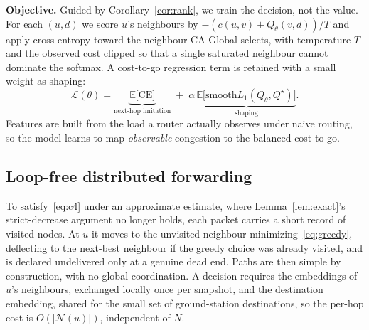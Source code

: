 \documentclass[conference]{IEEEtran}
\begin{document}
\textbf{Objective.} Guided by Corollary~\ref{cor:rank}, we train the decision, not the value. For each $(u,d)$ we score $u$'s neighbours by $-(c(u,v)+Q_\theta(v,d))/T$ and apply cross-entropy toward the neighbour CA-Global selects, with temperature $T$ and the observed cost clipped so that a single saturated neighbour cannot dominate the softmax. A cost-to-go regression term is retained with a small weight as shaping:
\begin{equation}
\mathcal{L}(\theta)=\underbrace{\mathbb{E}\big[\mathrm{CE}\big]}_{\text{next-hop imitation}}\;+\;\alpha\,\underbrace{\mathbb{E}\big[\mathrm{smooth}L_1(Q_\theta,Q^\star)\big]}_{\text{shaping}} .
\end{equation}
Features are built from the load a router actually observes under naive routing, so the model learns to map \emph{observable} congestion to the balanced cost-to-go.

\subsection{Loop-free distributed forwarding}
To satisfy~\eqref{eq:c4} under an approximate estimate, where Lemma~\ref{lem:exact}'s strict-decrease argument no longer holds, each packet carries a short record of visited nodes. At $u$ it moves to the unvisited neighbour minimizing~\eqref{eq:greedy}, deflecting to the next-best neighbour if the greedy choice was already visited, and is declared undelivered only at a genuine dead end. Paths are then simple by construction, with no global coordination. A decision requires the embeddings of $u$'s neighbours, exchanged locally once per snapshot, and the destination embedding, shared for the small set of ground-station destinations, so the per-hop cost is $O(\lvert\mathcal{N}(u)\rvert)$, independent of $N$.
\end{document}
